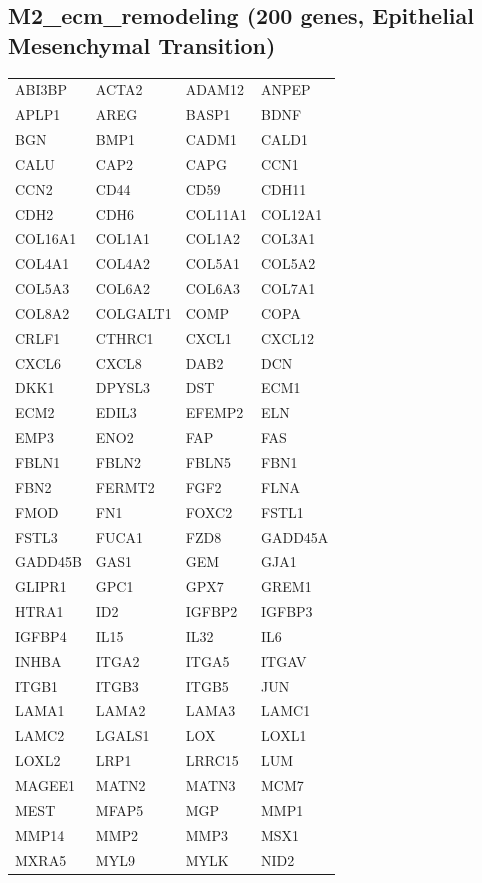 \subsection*{M2\_ecm\_remodeling (200 genes, Epithelial Mesenchymal Transition)}
\begin{longtable}{llll}
ABI3BP & ACTA2 & ADAM12 & ANPEP \\
APLP1 & AREG & BASP1 & BDNF \\
BGN & BMP1 & CADM1 & CALD1 \\
CALU & CAP2 & CAPG & CCN1 \\
CCN2 & CD44 & CD59 & CDH11 \\
CDH2 & CDH6 & COL11A1 & COL12A1 \\
COL16A1 & COL1A1 & COL1A2 & COL3A1 \\
COL4A1 & COL4A2 & COL5A1 & COL5A2 \\
COL5A3 & COL6A2 & COL6A3 & COL7A1 \\
COL8A2 & COLGALT1 & COMP & COPA \\
CRLF1 & CTHRC1 & CXCL1 & CXCL12 \\
CXCL6 & CXCL8 & DAB2 & DCN \\
DKK1 & DPYSL3 & DST & ECM1 \\
ECM2 & EDIL3 & EFEMP2 & ELN \\
EMP3 & ENO2 & FAP & FAS \\
FBLN1 & FBLN2 & FBLN5 & FBN1 \\
FBN2 & FERMT2 & FGF2 & FLNA \\
FMOD & FN1 & FOXC2 & FSTL1 \\
FSTL3 & FUCA1 & FZD8 & GADD45A \\
GADD45B & GAS1 & GEM & GJA1 \\
GLIPR1 & GPC1 & GPX7 & GREM1 \\
HTRA1 & ID2 & IGFBP2 & IGFBP3 \\
IGFBP4 & IL15 & IL32 & IL6 \\
INHBA & ITGA2 & ITGA5 & ITGAV \\
ITGB1 & ITGB3 & ITGB5 & JUN \\
LAMA1 & LAMA2 & LAMA3 & LAMC1 \\
LAMC2 & LGALS1 & LOX & LOXL1 \\
LOXL2 & LRP1 & LRRC15 & LUM \\
MAGEE1 & MATN2 & MATN3 & MCM7 \\
MEST & MFAP5 & MGP & MMP1 \\
MMP14 & MMP2 & MMP3 & MSX1 \\
MXRA5 & MYL9 & MYLK & NID2 \\

\end{longtable}
